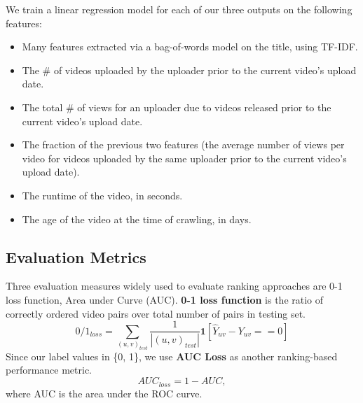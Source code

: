 	We train a linear regression model for each of our three outputs on the following features:
	\begin{itemize}
		\item
		Many features extracted via a bag-of-words model on the title, using TF-IDF.
	
		\item
		The \# of videos uploaded by the uploader prior to the current video's upload date.

		\item
		The total \# of views for an uploader due to videos released prior to the current video's upload date.
		
		\item
		The fraction of the previous two features (the average number of views per video for videos uploaded by the same uploader prior to the current video's upload date).
		
		\item
		The runtime of the video, in seconds.
	
		\item
		The age of the video at the time of crawling, in days.
	\end{itemize}
	
	\subsection{Evaluation Metrics}
	Three evaluation measures widely used to evaluate ranking approaches are 0-1 loss function, Area under Curve (AUC). \textbf{0-1 loss function} is the ratio of correctly ordered video pairs over total number of pairs in testing set.
	\begin{equation}
		0/1_{loss} = \sum_{(u, v)_{test}} \frac{1}{|(u,v)_{test}|} \textbf{1}[\hat{Y}_{uv} - Y_{uv} == 0]
	\end{equation}
	Since our label values in \{0, 1\}, we use  \textbf{AUC Loss} as another ranking-based performance metric.
	\begin{equation}
		AUC_{loss} = 1 - AUC,
	\end{equation}
	where AUC is the area under the ROC curve.


